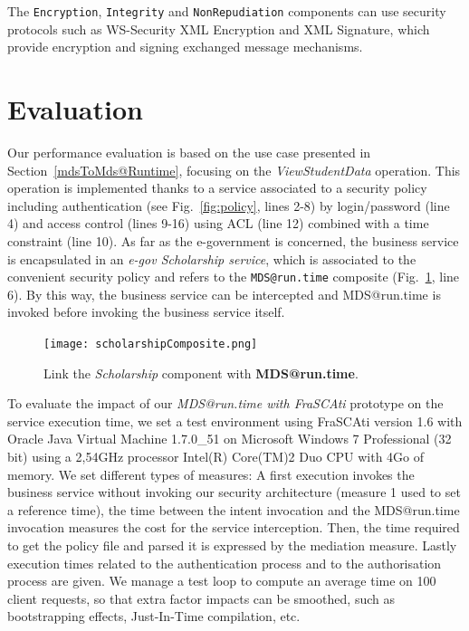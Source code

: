 \documentclass[runningheads,a4paper]{llncs}
\begin{document}
The \texttt{Encryption}, \texttt{Integrity} and \texttt{NonRepudiation} components can use security protocols such as WS-Security XML Encryption and XML Signature, which provide encryption and signing exchanged message mechanisms.


\section{Evaluation}

\label{sec:evaluation}


 Our performance evaluation is based on the use case presented in Section~\ref{mdsToMds@Runtime}, focusing on the \textit{ViewStudentData} operation. This operation is implemented thanks to a service associated to a security policy including authentication (see Fig.~\ref{fig:policy}, lines 2-8) by login/password (line 4) and access control (lines 9-16) using ACL (line 12) combined with a time constraint (line 10). As far as the e-government is concerned, the business service is encapsulated in an \textit{e-gov Scholarship service}, which is associated to the convenient security policy and refers to the \texttt{MDS@run.time} composite (Fig.~\ref{fig:gestionEtudiant}, line 6). By this way, the business service can be intercepted and MDS@run.time is invoked before invoking the business service itself.

\begin{figure}  
\center
\texttt{[image: scholarshipComposite.png]}
\caption{Link the \emph{Scholarship} component with \textbf{MDS@run.time}.}
\label{fig:gestionEtudiant}
\end{figure}



To evaluate the impact of our \textit{MDS@run.time with FraSCAti} prototype on the service execution time, we set a test environment using FraSCAti version 1.6 with Oracle Java Virtual Machine 1.7.0\_51 on Microsoft Windows 7 Professional (32 bit) using a 2,54GHz processor Intel(R) Core(TM)2 Duo CPU with 4Go of memory.
We set different types of measures: A first execution invokes the business service without invoking our security architecture (measure 1 used to set a reference time), the time between the intent invocation and the MDS@run.time invocation measures the cost for the service interception. Then, the time required to get the policy file and parsed it is expressed by the mediation measure. Lastly execution times related to the authentication process and to the authorisation process are given.
We manage a test loop to compute an average time on 100 client requests, so that extra factor impacts can be smoothed, such as bootstrapping effects, Just-In-Time compilation, etc.
\end{document}
